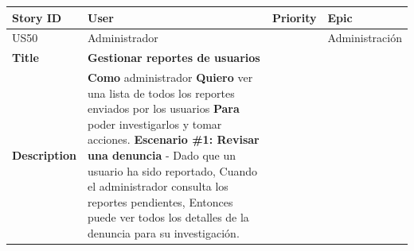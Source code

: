 {\def\LTcaptype{none} %
\begin{longtable}[]{@{}
  >{\raggedright\arraybackslash}p{}
  >{\raggedright\arraybackslash}p{}
  >{\raggedright\arraybackslash}p{}
  >{\raggedright\arraybackslash}p{}@{}}
\toprule\noalign{}
\begin{minipage}[b]{\linewidth}\raggedright
Story ID
\end{minipage} & \begin{minipage}[b]{\linewidth}\raggedright
User
\end{minipage} & \begin{minipage}[b]{\linewidth}\raggedright
Priority
\end{minipage} & \begin{minipage}[b]{\linewidth}\raggedright
Epic
\end{minipage} \\
\midrule\noalign{}
\endhead
\bottomrule\noalign{}
\endlastfoot
US50 & Administrador & 8 & Administración \\
\textbf{Title} & \textbf{Gestionar reportes de usuarios} & & \\
\textbf{Description} & \textbf{Como} administrador \textbf{Quiero} ver
una lista de todos los reportes enviados por los usuarios \textbf{Para}
poder investigarlos y tomar acciones. \textbf{Escenario \#1: Revisar una
denuncia} - Dado que un usuario ha sido reportado, Cuando el
administrador consulta los reportes pendientes, Entonces puede ver todos
los detalles de la denuncia para su investigación. & & \\
\end{longtable}
}

